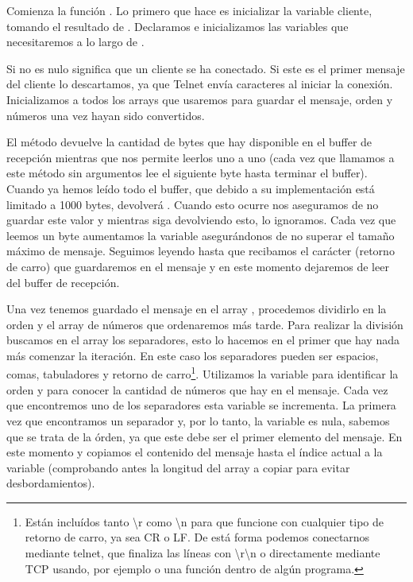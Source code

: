 
Comienza la función . Lo primero que hace es inicializar la variable cliente, tomando el resultado de . Declaramos e inicializamos las variables que necesitaremos a lo largo de .


Si  no es nulo significa que un cliente se ha conectado. Si este es el primer mensaje del cliente lo descartamos, ya que Telnet envía caracteres al iniciar la conexión. Inicializamos a  todos los arrays que usaremos para guardar el mensaje, orden y números una vez hayan sido convertidos.


El método  devuelve la cantidad de bytes que hay disponible en el buffer de recepción mientras que  nos permite leerlos uno a uno (cada vez que llamamos a este método sin argumentos lee el siguiente byte hasta terminar el buffer). Cuando ya hemos leído todo el buffer, que debido a su implementación está limitado a 1000 bytes,  devolverá . Cuando esto ocurre nos aseguramos de no guardar este valor y mientras siga devolviendo esto, lo ignoramos. Cada vez que leemos un byte aumentamos la variable  asegurándonos de no superar el tamaño máximo de mensaje. Seguimos leyendo hasta que recibamos el carácter  (retorno de carro) que guardaremos en el mensaje y en este momento dejaremos de leer del buffer de recepción.


Una vez tenemos guardado el mensaje en el array , procedemos dividirlo en la orden y el array de números que ordenaremos más tarde. Para realizar la división buscamos en el array los separadores, esto lo hacemos en el primer  que hay nada más comenzar la iteración. En este caso los separadores pueden ser espacios, comas, tabuladores y retorno de carro\protect\footnote{Están incluídos tanto \textbackslash r como \textbackslash n para que funcione con cualquier tipo de retorno de carro, ya sea CR o LF. De está forma podemos conectarnos mediante telnet, que finaliza las líneas con \textbackslash r\textbackslash n o directamente mediante TCP usando, por ejemplo  o una función dentro de algún programa.}. Utilizamos la variable  para identificar la orden y para conocer la cantidad de números que hay en el mensaje. Cada vez que encontremos uno de los separadores esta variable se incrementa. La primera vez que encontramos un separador y, por lo tanto, la variable  es nula, sabemos que se trata de la órden, ya que este debe ser el primer elemento del mensaje. En este momento y copiamos el contenido del mensaje hasta el índice actual a la variable  (comprobando antes la longitud del array a copiar para evitar desbordamientos).

